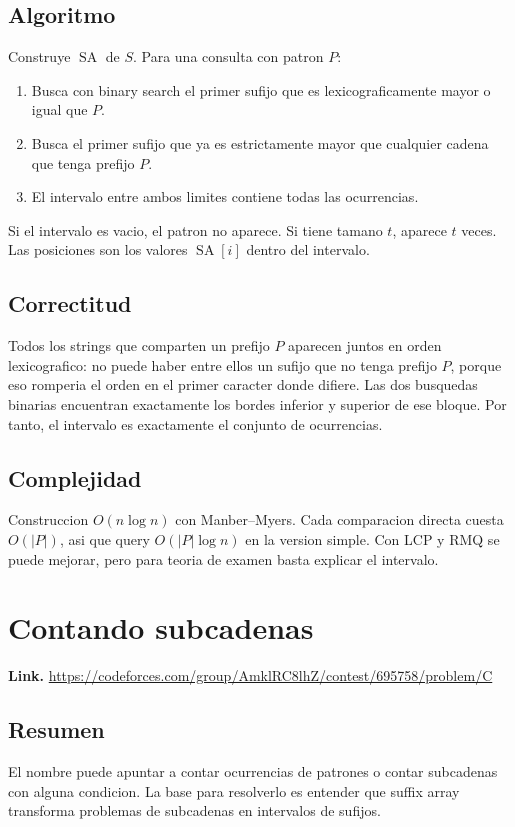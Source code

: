 \documentclass[10pt]{article}
\newcommand{\bigO}{O}
\newcommand{\SA}{\operatorname{SA}}
\begin{document}
\subsection*{Algoritmo}
Construye $\SA$ de $S$. Para una consulta con patron $P$:
\begin{enumerate}[leftmargin=*]
\item Busca con binary search el primer sufijo que es lexicograficamente mayor
o igual que $P$.
\item Busca el primer sufijo que ya es estrictamente mayor que cualquier cadena
que tenga prefijo $P$.
\item El intervalo entre ambos limites contiene todas las ocurrencias.
\end{enumerate}
Si el intervalo es vacio, el patron no aparece. Si tiene tamano $t$, aparece
$t$ veces. Las posiciones son los valores $\SA[i]$ dentro del intervalo.

\subsection*{Correctitud}
Todos los strings que comparten un prefijo $P$ aparecen juntos en orden
lexicografico: no puede haber entre ellos un sufijo que no tenga prefijo $P$,
porque eso romperia el orden en el primer caracter donde difiere. Las dos
busquedas binarias encuentran exactamente los bordes inferior y superior de ese
bloque. Por tanto, el intervalo es exactamente el conjunto de ocurrencias.

\subsection*{Complejidad}
Construccion $\bigO(n\log n)$ con Manber--Myers. Cada comparacion directa cuesta
$\bigO(|P|)$, asi que query $\bigO(|P|\log n)$ en la version simple. Con LCP y
RMQ se puede mejorar, pero para teoria de examen basta explicar el intervalo.

\clearpage
\section{Contando subcadenas}
\textbf{Link.} \url{https://codeforces.com/group/AmklRC8lhZ/contest/695758/problem/C}

\subsection*{Resumen}
El nombre puede apuntar a contar ocurrencias de patrones o contar subcadenas con
alguna condicion. La base para resolverlo es entender que suffix array transforma
problemas de subcadenas en intervalos de sufijos.
\end{document}
